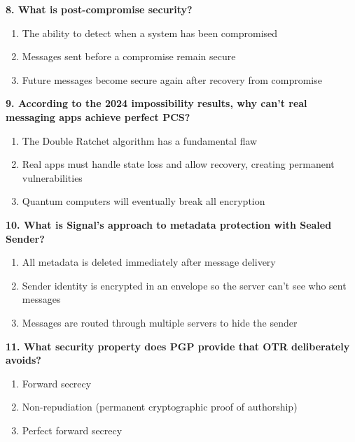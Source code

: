 \documentclass[10pt,a4paper,american]{article}
\begin{document}
\textbf{8. What is post-compromise security?}
\begin{enumerate}[label=\alph*)]
	\item The ability to detect when a system has been compromised
	\item Messages sent before a compromise remain secure
	\item Future messages become secure again after recovery from compromise
\end{enumerate}

\vspace{0.5em}

\textbf{9. According to the 2024 impossibility results, why can't real messaging apps achieve perfect PCS?}
\begin{enumerate}[label=\alph*)]
	\item The Double Ratchet algorithm has a fundamental flaw
	\item Real apps must handle state loss and allow recovery, creating permanent vulnerabilities
	\item Quantum computers will eventually break all encryption
\end{enumerate}

\vspace{0.5em}

\textbf{10. What is Signal's approach to metadata protection with Sealed Sender?}
\begin{enumerate}[label=\alph*)]
	\item All metadata is deleted immediately after message delivery
	\item Sender identity is encrypted in an envelope so the server can't see who sent messages
	\item Messages are routed through multiple servers to hide the sender
\end{enumerate}

\vspace{0.5em}

\textbf{11. What security property does PGP provide that OTR deliberately avoids?}
\begin{enumerate}[label=\alph*)]
	\item Forward secrecy
	\item Non-repudiation (permanent cryptographic proof of authorship)
	\item Perfect forward secrecy
\end{enumerate}

\vspace{0.5em}
\end{document}
